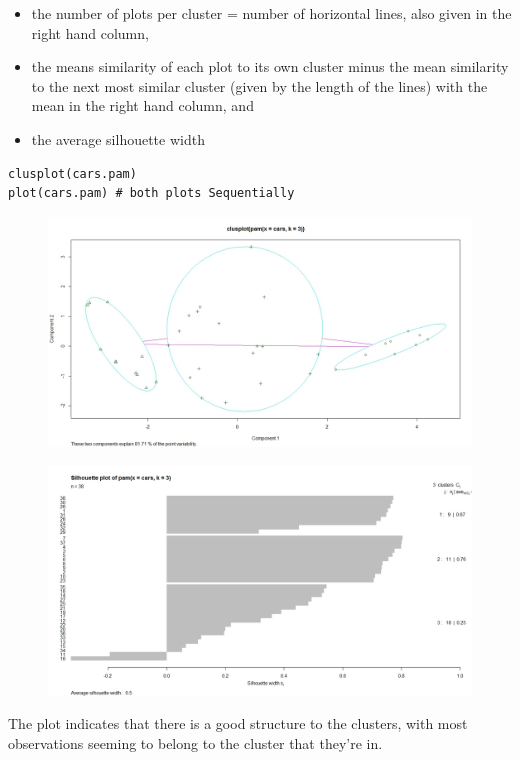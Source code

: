 \documentclass[12pt]{article}
\begin{document}
\begin{itemize}
\item the number of plots per cluster = number of horizontal lines, also given in the right hand column,
\item the means similarity of each plot to its own cluster minus the mean similarity to the next most similar cluster (given by the length of the lines) with the mean in the right hand column, and
\item the average silhouette width
\end{itemize}

\newpage
\begin{framed}
\begin{verbatim}
clusplot(cars.pam)
plot(cars.pam) # both plots Sequentially
\end{verbatim}
\end{framed}
\begin{figure}[h!]
\centering
\includegraphics[width=0.8\linewidth]{./ClusPlot}

\label{fig:ClusPlot}
\end{figure}

\begin{figure}[h!]
\centering
\includegraphics[width=0.8\linewidth]{./SiloPlot}

\label{fig:SiloPlot}
\end{figure}

The plot indicates that there is a good structure to the clusters, with most observations seeming to belong to the cluster that they're in. 
\end{document}
